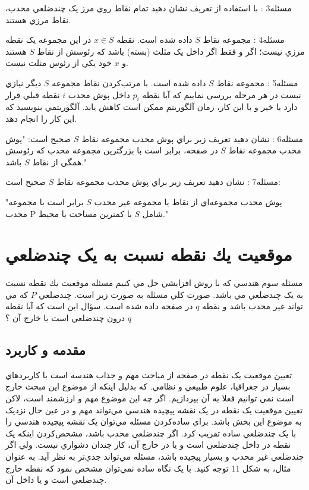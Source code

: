 \documentclass{book}
\begin{document}
مسئله3 : با استفاده از تعريف نشان دهيد تمام نقاط روي مرز يک چندضلعي محدب، نقاط مرزي هستند. 

مسئله4 : مجموعه نقاط $S$ داده شده است. نقطه $x\in S$ در اين مجموعه يک نقطه مرزي نيست؛ اگر و فقط اگر داخل يک مثلث (بسته) باشد كه رئوسش از نقاط $S$ هستند و $x$ خود يكي از رئوس مثلث نيست. 

مسئله5 : مجموعه نقاط $S$ داده شده است. با مرتب‌کردن نقاط مجموعه $S$ ديگر نيازي نيست در هر مرحله بررسي نماييم که آيا نقطه $p_i$ داخل پوش محدب $i$ نقطه قبلي قرار دارد يا خير و با اين کار، زمان آلگوريتم ممکن است کاهش يابد. آلگوريتمي بنويسيد که اين کار را انجام دهد. 

مسئله6 : نشان دهيد تعريف زير براي پوش محدب مجموعه نقاط $S$ صحيح است:
 "پوش محدب مجموعه نقاط $S$ در صفحه، برابر است با بزرگترين مجموعه محدب که رئوسش همگي از نقاط $S$ باشد."

مسئله7 : نشان دهيد تعريف زير براي پوش محدب مجموعه نقاط $S$ صحيح است:

"پوش محدب مجموعه‌اي از نقاط يا مجموعه غير محدب $S$ برابر است با مجموعه محدب P شامل $S$ با کمترين مساحت يا محيط."

\section{موقعيت يك نقطه نسبت به يک چندضلعي}

مسئله سوم هندسي که با روش افزايشي حل مي کنيم مسئله موقعيت يك نقطه نسبت به يک چندضلعي مي باشد. صورت کلي مسئله به صورت زير است.
چندضلعي $P$ که مي تواند غير محدب باشد و نقطه $q$ در صفحه داده شده است. سؤال اين است که آيا نقطه $q$ درون چندضلعي است يا خارج آن ؟

\subsection{مقدمه و کاربرد}

تعيين موقعيت يک نقطه در صفحه از مباحث مهم و جذاب هندسه است با کاربردهاي بسيار در جغرافيا، علوم طبيعي و نظامي. که بدليل اينکه از موضوع اين مبحث خارج است نمي توانيم فعلا به آن بپردازيم. اگر چه اين موضوع مهم و ارزشمند است، لاکن تعيين موقعيت يک نقطه در يک نقشه پيچيده هندسي مي‌تواند مهم و در عين حال نزديک به موضوع اين بخش باشد. براي ساده‌کردن مسئله مي‌توان يک نقشه پيچيده هندسي را با يک چندضلعي ساده تقريب کرد. اگر چندضلعي محدب باشد، مشخص‌کردن اينکه يک نقطه در داخل چندضلعي است و يا در خارج آن، کار چندان دشواري نيست. ولي اگر چندضلعي غير محدب و بسيار پيچيده باشد، مسئله مي‌تواند جدي‌تر به نظر آيد. به عنوان مثال، به شکل 11 توجه کنيد. با يک نگاه ساده نمي‌توان مشخص نمود که نقطه خارج چندضلعي است و يا داخل آن. 
\end{document}
